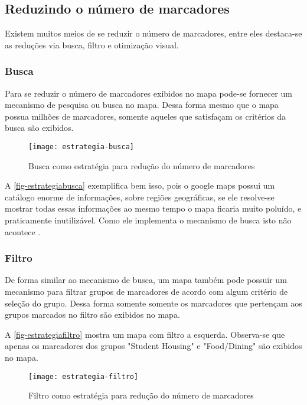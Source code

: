  \subsection{Reduzindo o número de marcadores}
  Existem muitos meios de se reduzir o número de marcadores, entre eles destaca-se as reduções via busca, filtro e otimização visual.
	\subsubsection{Busca}
	Para se reduzir  o número de marcadores exibidos no mapa pode-se fornecer um mecanismo de pesquisa ou busca no mapa. Dessa forma mesmo que o mapa possua milhões de marcadores, somente aqueles que satisfaçam os critérios da busca são exibidos.
	
	 \begin{figure}[htb]
	\caption{\label{fig-estrategiabusca}Busca como estratégia para redução do número de marcadores}
	\begin{center}
	    \texttt{[image: estrategia-busca]}
	\end{center}
	\end{figure}
	 
	 A \autoref{fig-estrategiabusca}  exemplifica bem isso, pois o google maps possui um catálogo enorme de informações, sobre regiões geográficas, se ele resolve-se mostrar todas essas informações ao mesmo tempo o mapa ficaria muito poluído, e praticamente inutilizável. Como ele implementa o mecanismo de busca isto não acontece . 
	
	\subsubsection{Filtro}
	De forma similar ao mecanismo de busca, um mapa também pode possuir um mecanismo para filtrar grupos de marcadores de acordo com algum critério de seleção do grupo. Dessa forma somente somente os marcadores que pertençam aos grupos marcados no filtro são exibidos no mapa.
	
	A \autoref{fig-estrategiafiltro} mostra um mapa com filtro a esquerda. Observa-se que apenas os marcadores dos grupos  "Student Housing" e "Food/Dining"  são exibidos no mapa.
	 \begin{figure}[htb]
	\caption{\label{fig-estrategiafiltro}Filtro como estratégia para redução do número de marcadores}
	\begin{center}
	    \texttt{[image: estrategia-filtro]}
	\end{center}
	\end{figure}
	 
